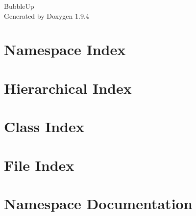 \documentclass[twoside]{book}
\newcommand{\+}{\discretionary{\mbox{\scriptsize$\hookleftarrow$}}{}{}}
\newcommand{\clearemptydoublepage}{%
    \newpage{\pagestyle{empty}\cleardoublepage}%
  }
\begin{document}
  \raggedbottom
    \hypersetup{pageanchor=false,
                bookmarksnumbered=true,
                pdfencoding=unicode
               }
  \begin{titlepage}
  \vspace*{7cm}
  \begin{center}%
  {\Large Bubble\+Up}\\
  \vspace*{1cm}
  {\large Generated by Doxygen 1.9.4}\\
  \end{center}
  \end{titlepage}
  \clearemptydoublepage
  \tableofcontents
  \clearemptydoublepage
  \hypersetup{pageanchor=true}
\chapter{Namespace Index}

\chapter{Hierarchical Index}

\chapter{Class Index}

\chapter{File Index}

\chapter{Namespace Documentation}













\end{document}
